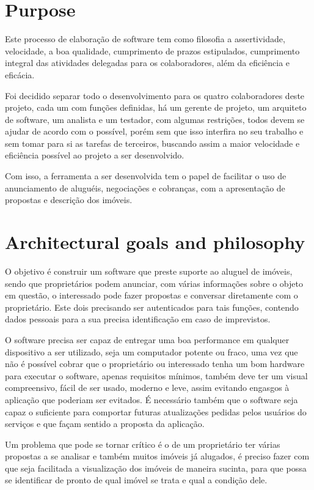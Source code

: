 \section*{Purpose}

Este processo de elaboração de software tem como filosofia a assertividade, velocidade, a boa qualidade, cumprimento de prazos estipulados, cumprimento integral das atividades delegadas para os colaboradores, além da eficiência e eficácia.

Foi decidido separar todo o desenvolvimento para os quatro colaboradores deste projeto, cada um com funções definidas, há um gerente de projeto, um arquiteto de software, um analista e um testador, com algumas restrições, todos devem se ajudar de acordo com o possível, porém sem que isso interfira no seu trabalho e sem tomar para si as tarefas de terceiros, buscando assim a maior velocidade e eficiência possível ao projeto a ser desenvolvido.

Com isso, a ferramenta a ser desenvolvida tem o papel de facilitar o uso de anunciamento de aluguéis, negociações e cobranças, com a apresentação de propostas e descrição dos imóveis.

\section*{Architectural goals and philosophy}

O objetivo é construir um software que preste suporte ao aluguel de imóveis, sendo que proprietários podem anunciar, com várias informações sobre o objeto em questão, o interessado pode fazer propostas e conversar diretamente com o proprietário. Este dois precisando ser autenticados para tais funções, contendo dados pessoais para a sua precisa identificação em caso de imprevistos.

O software precisa ser capaz de entregar uma boa performance em qualquer dispositivo a ser utilizado, seja um computador potente ou fraco, uma vez que não é possível cobrar que o proprietário ou interessado tenha um bom hardware para executar o software, apenas requisitos mínimos, também deve ter um visual compreensivo, fácil de ser usado, moderno e leve, assim evitando engasgos à aplicação que poderiam ser evitados. É necessário também que o software seja capaz o suficiente para comportar futuras atualizações pedidas pelos usuários do serviços e que façam sentido a proposta da aplicação.

Um problema que pode se tornar crítico é o de um proprietário ter várias propostas a se analisar e também muitos imóveis já alugados, é preciso fazer com que seja facilitada a visualização dos imóveis de maneira sucinta, para que possa se identificar de pronto de qual imóvel se trata e qual a condição dele.

